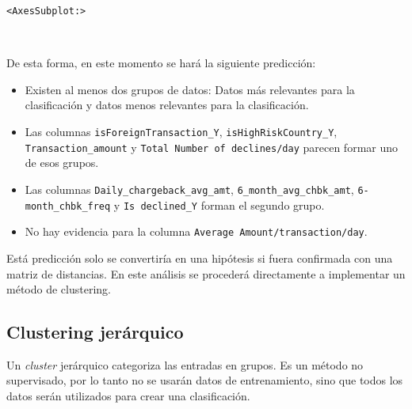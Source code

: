 \documentclass[12pt,a4paper,table]{article}
\makeatletter
\providecommand{\tightlist}{%
      \setlength{\itemsep}{0pt}\setlength{\parskip}{0pt}}
\newcommand{\boxspacing}{\kern\kvtcb@left@rule\kern\kvtcb@boxsep}
\newcommand{\prompt}[4]{
        {\ttfamily\llap{{\color{#2}[#3]:\hspace{3pt}#4}}\vspace{-\baselineskip}}
    }
\makeatother
\begin{document}
            \begin{tcolorbox}[breakable, size=fbox, boxrule=.5pt, pad at break*=1mm, opacityfill=0]
\prompt{Out}{outcolor}{12}{\boxspacing}
\begin{Verbatim}[commandchars=\\\{\}]
<AxesSubplot:>
\end{Verbatim}
\end{tcolorbox}
        
    \begin{center}
    \end{center}
    { \hspace*{\fill} \\}
    
    De esta forma, en este momento se hará la siguiente predicción:

\begin{itemize}
\tightlist
\item
  Existen al menos dos grupos de datos: Datos más relevantes para la
  clasificación y datos menos relevantes para la clasificación.
\item
  Las columnas \texttt{isForeignTransaction\_Y},
  \texttt{isHighRiskCountry\_Y}, \texttt{Transaction\_amount} y
  \texttt{Total\ Number\ of\ declines/day} parecen formar uno de esos
  grupos.
\item
  Las columnas \texttt{Daily\_chargeback\_avg\_amt},
  \texttt{6\_month\_avg\_chbk\_amt}, \texttt{6-month\_chbk\_freq} y
  \texttt{Is\ declined\_Y} forman el segundo grupo.
\item
  No hay evidencia para la columna
  \texttt{Average\ Amount/transaction/day}.
\end{itemize}

Está predicción solo se convertiría en una hipótesis si fuera confirmada
con una matriz de distancias. En este análisis se procederá directamente
a implementar un método de clustering.

    \hypertarget{clustering-jeruxe1rquico}{%
\subsection*{Clustering jerárquico}\label{clustering-jeruxe1rquico}}

Un \emph{cluster} jerárquico categoriza las entradas en grupos. Es un
método no supervisado, por lo tanto no se usarán datos de entrenamiento,
sino que todos los datos serán utilizados para crear una clasificación.
\end{document}
